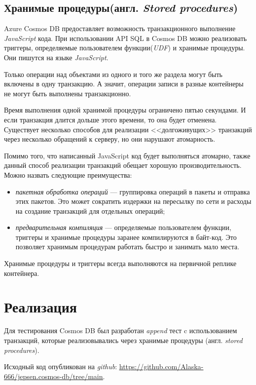 \documentclass[14pt,  openany]{book}
\begin{document}
\subsection{Хранимые процедуры(англ. \textit{Stored procedures})}
Azure Cosmos DB предоставляет возможность транзакционного выполнение \textit{JavaScript} кода. При использовании API SQL в Cosmos DB можно реализовать триггеры, определяемые пользователем функции(\textit{UDF}) и хранимые процедуры.  Они пишутся на языке \textit{JavaScript}. 
\par Только операции над объектами из одного и того же раздела могут быть включены в одну транзакцию.  А значит, операции записи в разные контейнеры не могут быть выполнены транзакционно. 
\par Время выполнения одной хранимой процедуры ограничено пятью секундами.  И если транзакция длится дольше этого времени, то она будет отменена. Существует несколько способов для реализации <<долгоживущих>> транзакций через несколько обращений к серверу, но они нарушают атомарность.
\par Помимо того, что написанный JavaScript код будет выполняться атомарно, также данный способ реализации транзакций обещает хорошую производительность. Можно назвать следующие преимущества:
\begin{itemize}
\item \textit{пакетная обработка операций} --- группировка операций в пакеты и отправка этих пакетов. Это может сократить издержки на пересылку по сети и расходы на создание транзакций для отдельных операций; 
\item \textit{предварительная компиляция} --- определяемые пользователем функции, триггеры и хранимые процедуры заранее компилируются в байт-код.  Это позволяет хранимым процедурам работать быстро и занимать мало места.
\end{itemize}
\par
Хранимые процедуры и триггеры всегда выполняются на первичной реплике контейнера. 

\section{Реализация}
Для тестирования Cosmos DB был разработан \textit{append} тест c использованием транзакций, которые реализовывались через хранимые процедуры (англ. \textit{stored procedures}).  
\par Исходный код опубликован на \textit{github}: \newline 
\underline{\href{https://github.com/Alaska-666/jepsen.cosmos-db/tree/main}{https://github.com/Alaska-666/jepsen.cosmos-db/tree/main}}.
\end{document}
